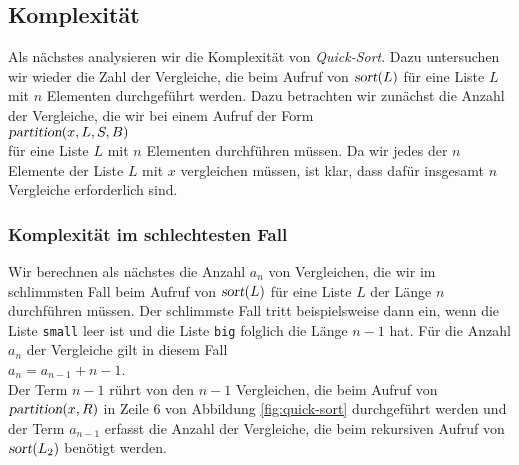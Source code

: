 \subsection{Komplexit\"at}
Als n\"achstes analysieren wir die Komplexit\"at von \emph{Quick-Sort}.
Dazu untersuchen wir wieder die Zahl der Vergleiche, die beim Aufruf von
$\textsl{sort}(L)$ f\"ur eine Liste $L$ mit $n$ 
Elementen durchgef\"uhrt werden. Dazu betrachten wir zun\"achst die Anzahl der Vergleiche,
die wir bei einem Aufruf der Form
\\[0.2cm]
\hspace*{1.3cm}
$\textsl{partition}(x,L,S,B)$ \\[0.2cm]
f\"ur eine Liste $L$ mit $n$ Elementen durchf\"uhren m\"ussen. 
Da wir jedes der $n$ Elemente der Liste $L$ mit $x$ vergleichen m\"ussen, ist klar, dass 
daf\"ur insgesamt $n$ Vergleiche erforderlich sind.

\subsubsection{Komplexit\"at im schlechtesten Fall}
Wir berechnen als n\"achstes die Anzahl $a_n$ von Vergleichen, die wir im schlimmsten Fall
beim Aufruf von $\textsl{sort}(L)$ f\"ur eine Liste $L$ der L\"ange $n$ durchf\"uhren m\"ussen.
Der schlimmste Fall tritt beispielsweise dann ein, wenn die Liste \texttt{small} leer ist und 
die Liste \texttt{big} folglich  die L\"ange $n-1$ hat.   F\"ur die Anzahl
$a_n$ der Vergleiche gilt in diesem Fall \\[0.1cm]
\hspace*{1.3cm} $a_n = a_{n-1} + n - 1$. \\[0.1cm]
Der Term $n-1$ r\"uhrt von den $n-1$ Vergleichen, die beim Aufruf von
$\textsl{partition}(x,R)$ in Zeile 6 von Abbildung \ref{fig:quick-sort} durchgef\"uhrt
werden und der Term $a_{n-1}$ erfasst die Anzahl der Vergleiche, die beim rekursiven Aufruf
von $\textsl{sort}(L_2)$ ben\"otigt werden.

